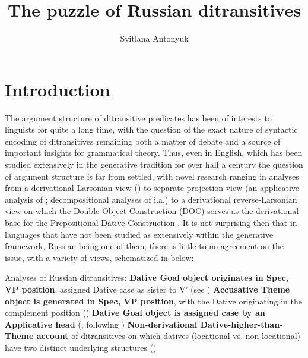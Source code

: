 \documentclass[output=paper,colorlinks,citecolor=brown,nonflat]{./langscibook}
\author{Svitlana Antonyuk	\affiliation{University of Connecticut}}
\title{The puzzle of Russian ditransitives}
\begin{document}
\maketitle





\section{Introduction}\label{sec:antonyuk:1}

The argument structure of ditransitive predicates has been of interests to linguists for quite a long time, with the question of the exact nature of syntactic encoding of ditransitives remaining both a matter of debate and a source of important insights for grammatical theory. Thus, even in English, which has been studied extensively in the generative tradition for over half a century the question of argument structure is far from settled, with novel research ranging in analyses from a derivational Larsonian view (\citealt{Larson1988, Larson2014}) to separate projection view (an applicative analysis of \citealt{Marantz1993}; decompositional analyses of \citealt{Pesetsky1995, Harley1995Diss, Harley2002} i.a.) to a derivational reverse-Larsonian view on which the Double Object Construction (DOC) serves as the derivational base for the Prepositional Dative Construction \citep{Hallman2015}. It is not surprising then that in languages that have not been studied as extensively within the generative framework, Russian being one of them, there is little to no agreement on the issue, with a variety of views, schematized in  below:

\ea%
    \label{ex:antonyuk:1}
    Analyses of Russian ditransitives:
    \ea \textbf{Dative Goal object originates in Spec, VP position}, assigned Dative case as sister to V’ (see \citealt{HarbertToribio1991, GreenbergFranks1991, Franks1995, Richardson2007})
    \ex \textbf{Accusative Theme object is generated in Spec, VP position}, with the Dative originating in the complement position (\citealt{Bailyn1995, Bailyn2010, Bailyn2012, Titov2017})
    \ex \textbf{Dative Goal object is assigned case by an Applicative head} (\citealt{Dyakonova2005, Dyakonova2009}, following \citealt{Pylkkänen2002})
    \ex \textbf{Non-derivational Dative-higher-than-Theme account} of ditransitives on which datives (locational vs. non-locational) have two distinct underlying structures (\citealt{BonehNash2017})
    \z
\z
\end{document}
